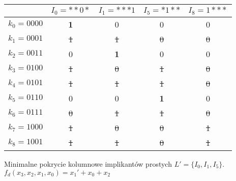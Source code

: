 \begin{table}[H]
    \centering
    \begin{tabular}[t]{ |c||c|c|c|c| }
        \hline
        & $I_0 = {*}{*}0{*}$ & $I_1 = {*}{*}{*}1$ & $I_5 = {*}1{*}{*}$ & $I_8 = 1{*}{*}{*}$ \\
        \hline
        \hline
        $k_0 = 0000$ & \textbf{1} & 0 & 0 & 0 \\
        \hline
        \sout{$k_1 = 0001$} & \sout{1} & \sout{1} & \sout{0} & \sout{0} \\
        \hline
        $k_2 = 0011$ & 0 & \textbf{1} & 0 & 0 \\
        \hline
        \sout{$k_3 = 0100$} & \sout{1} & \sout{0} & \sout{1} & \sout{0} \\
        \hline
        \sout{$k_4 = 0101$} & \sout{1} & \sout{1} & \sout{1} & \sout{0} \\
        \hline
        $k_5 = 0110$ & 0 & 0 & \textbf{1} & 0 \\
        \hline
        \sout{$k_6 = 0111$} & \sout{0} & \sout{1} & \sout{1} & \sout{0} \\
        \hline
        \sout{$k_7 = 1000$} & \sout{1} & \sout{0} & \sout{0} & \sout{1} \\
        \hline
        \sout{$k_8 = 1001$} & \sout{1} & \sout{1} & \sout{0} & \sout{1} \\
        \hline
    \end{tabular}
    \caption{} \label{tab:min-block}
\end{table}

Minimalne pokrycie kolumnowe implikantów prostych $L' = \{I_0, I_1, I_5\}$.
$f_d(x_3, x_2, x_1, x_0) = x_1' + x_0 + x_2$